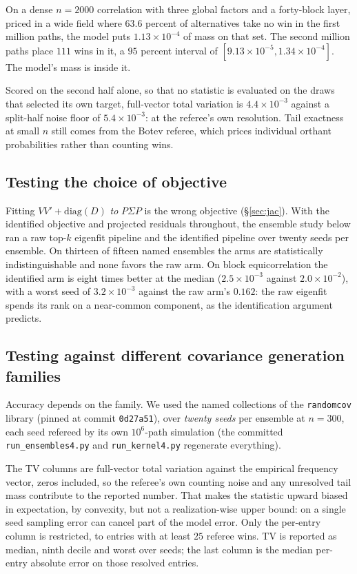 \documentclass[11pt]{article}
\begin{document}
On a dense $n=2000$ correlation with three global factors and a
forty-block layer, priced in a wide field where $63.6$ percent of
alternatives take no win in the first million paths, the model puts
$1.13\times10^{-4}$ of mass on that set. The second million paths place
$111$ wins in it, a $95$ percent interval of
$[9.13\times10^{-5},1.34\times10^{-4}]$. The model's mass is inside it.

Scored on the second half alone, so that no statistic is evaluated on the
draws that selected its own target, full-vector total variation is
$4.4\times10^{-3}$ against a split-half noise floor of $5.4\times10^{-3}$:
at the referee's own resolution. Tail exactness at small $n$ still comes
from the Botev referee, which prices individual orthant probabilities
rather than counting wins.

\subsection{Testing the choice of objective}

Fitting
$VV'+\mathrm{diag}(D)$ \emph{to} $P\Sigma P$ is the wrong
objective (\S\ref{sec:jac}). With the identified objective and projected residuals throughout, the ensemble
study below ran a raw top-$k$ eigenfit pipeline and the identified
pipeline over twenty seeds per ensemble. On thirteen of fifteen named
ensembles the arms are statistically indistinguishable and none favors
the raw arm. On block equicorrelation the identified arm is eight
times better at the median ($2.5\times10^{-3}$ against
$2.0\times10^{-2}$), with a worst seed of $3.2\times10^{-3}$ against
the raw arm's $0.162$: the raw eigenfit spends its rank on a
near-common component, as the identification argument predicts.


\subsection{Testing against different covariance generation families}

Accuracy depends on the family. We used the named collections of the \texttt{randomcov} library (pinned at commit
\texttt{0d27a51}), over \emph{twenty seeds} per ensemble at $n=300$,
each seed refereed by its own $10^6$-path simulation (the committed
\texttt{run\_ensembles4.py} and \texttt{run\_kernel4.py} regenerate
everything).

The TV columns are full-vector total variation against the empirical
frequency vector, zeros included, so the referee's own counting noise and
any unresolved tail mass contribute to the reported number. That makes
the statistic upward biased in expectation, by convexity, but not a
realization-wise upper bound: on a single seed sampling error can cancel
part of the model error. Only the per-entry column is restricted, to
entries with at least $25$ referee wins. TV is reported as median, ninth
decile and worst over seeds; the last column is the median per-entry
absolute error on those resolved entries.
\end{document}
